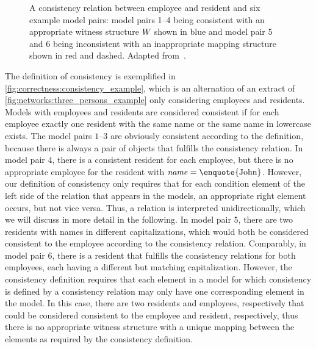 \begin{figure}
    \centering
    
    \caption[Examples for fine-grained consistency relations]{A consistency relation between employee and resident and six example model pairs: model pairs 1--4 being consistent with an appropriate witness structure $\consistencyrelation{W}{}$ shown in blue and model pair 5 and 6 being inconsistent with an inappropriate mapping structure shown in red and dashed. Adapted from~.}
    \label{fig:correctness:consistency_example}
\end{figure}

\begin{example}
The definition of consistency is exemplified in \autoref{fig:correctness:consistency_example}, which is an alternation of an extract of \autoref{fig:networks:three_persons_example} only considering employees and residents. Models with employees and residents are considered consistent if for each employee exactly one resident with the same name or the same name in lowercase exists.
The model pairs $1$--$3$ are obviously consistent according to the definition, because there is always a pair of objects that fulfills the consistency relation.
In model pair $4$, there is a consistent resident for each employee, but there is no appropriate employee for the resident with $\mathvariable{name} = \text{\enquote{John}}$. However, our definition of consistency only requires that for each condition element of the left side of the relation that appears in the models, an appropriate right element occurs, but not vice versa. Thus, a relation is interpreted unidirectionally, which we will discuss in more detail in the following.
In model pair $5$, there are two residents with names in different capitalizations, which would both be considered consistent to the employee according to the consistency relation.
Comparably, in model pair $6$, there is a resident that fulfills the consistency relations for both employees, each having a different but matching capitalization. 
However, the consistency definition requires that each element in a model for which consistency is defined by a consistency relation may only have one corresponding element %
in the model. 
In this case, there are two residents and employees, respectively that could be considered consistent to the employee and resident, respectively, thus there is no appropriate witness structure with a unique mapping between the elements as required by the consistency definition.
\end{example}

